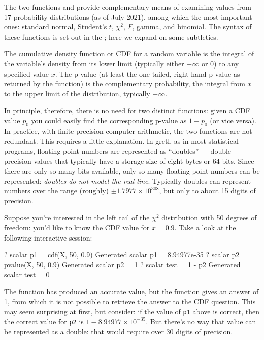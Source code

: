 The two functions  and  provide complementary
means of examining values from 17 probability distributions (as of 
July 2021), among which the most important ones:
standard normal, Student's $t$, $\chi^2$, $F$, gamma, and binomial.
The syntax of these functions is set out in the \GCR; here we expand
on some subtleties.

The cumulative density function or CDF for a random variable
is the integral of the variable's density from its lower limit
(typically either $-\infty$ or 0) to any specified value $x$.  The
p-value (at least the one-tailed, right-hand p-value as returned by
the  function) is the complementary probability, the
integral from $x$ to the upper limit of the distribution, typically
$+\infty$.

In principle, therefore, there is no need for two distinct functions:
given a CDF value $p_0$ you could easily find the corresponding
p-value as $1-p_0$ (or vice versa).  In practice, with
finite-precision computer arithmetic, the two functions are not
redundant.  This requires a little explanation.  In gretl, as in
most statistical programs, floating point numbers are represented as
``doubles'' --- double-precision values that typically have a storage
size of eight bytes or 64 bits.  Since there are only so many bits
available, only so many floating-point numbers can be represented:
\textit{doubles do not model the real line}.  Typically doubles can
represent numbers over the range (roughly) $\pm 1.7977 \times
10^{308}$, but only to about 15 digits of precision.

Suppose you're interested in the left tail of the $\chi^2$ distribution
with 50 degrees of freedom: you'd like to know the CDF value for $x =
0.9$.  Take a look at the following interactive session:
\begin{code}
? scalar p1 = cdf(X, 50, 0.9)
Generated scalar p1 = 8.94977e-35
? scalar p2 = pvalue(X, 50, 0.9)
Generated scalar p2 = 1
? scalar test = 1 - p2
Generated scalar test = 0
\end{code}

The  function has produced an accurate value, but the
 function gives an answer of 1, from which it is not
possible to retrieve the answer to the CDF question.  This may seem
surprising at first, but consider: if the value of \texttt{p1} above
is correct, then the correct value for \texttt{p2} is $1 - 8.94977
\times 10^{-35}$.  But there's no way that value can be represented as
a double: that would require over 30 digits of precision.

